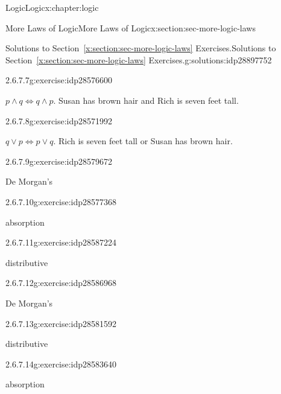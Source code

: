 \documentclass[twoside,10pt,]{book}
\newcommand{\xreffont}{\relax}
\numberwithin{equation}{section}
\begin{document}
\begin{chapterptx}{Logic}{}{Logic}{}{}{x:chapter:logic}
\begin{sectionptx}{More Laws of Logic}{}{More Laws of Logic}{}{}{x:section:sec-more-logic-laws}
\begin{solutions-subsection}{Solutions to Section~{\xreffont\ref*{x:section:sec-more-logic-laws}} Exercises.}{}{Solutions to Section~{\xreffont\ref*{x:section:sec-more-logic-laws}} Exercises.}{}{}{g:solutions:idp28897752}
\begin{exercisegroup}
\begin{divisionsolutioneg}{2.6.7.7}{}{g:exercise:idp28576600}%
\par\smallskip%
\noindent\hypertarget{g:solution:idp28574168-main}{}\(p {\wedge}{} q  {\Leftrightarrow}{}  q {\wedge}{} p\).  Susan has brown hair and Rich is seven feet tall.\end{divisionsolutioneg}%
\begin{divisionsolutioneg}{2.6.7.8}{}{g:exercise:idp28571992}%
\par\smallskip%
\noindent\hypertarget{g:solution:idp28573528-main}{}\(q {\vee}{} p  {\Leftrightarrow}{}  p {\vee}{} q\).  Rich is seven feet tall or Susan has brown hair.\end{divisionsolutioneg}%
\end{exercisegroup}
\par\medskip\noindent
\begin{exercisegroup}
\begin{divisionsolutioneg}{2.6.7.9}{}{g:exercise:idp28579672}%
\par\smallskip%
\noindent\hypertarget{g:solution:idp28576728-main}{}De Morgan's\end{divisionsolutioneg}%
\begin{divisionsolutioneg}{2.6.7.10}{}{g:exercise:idp28577368}%
\par\smallskip%
\noindent\hypertarget{g:solution:idp28583384-main}{}absorption\end{divisionsolutioneg}%
\begin{divisionsolutioneg}{2.6.7.11}{}{g:exercise:idp28587224}%
\par\smallskip%
\noindent\hypertarget{g:solution:idp28585816-main}{}distributive\end{divisionsolutioneg}%
\begin{divisionsolutioneg}{2.6.7.12}{}{g:exercise:idp28586968}%
\par\smallskip%
\noindent\hypertarget{g:solution:idp28585560-main}{}De Morgan's\end{divisionsolutioneg}%
\begin{divisionsolutioneg}{2.6.7.13}{}{g:exercise:idp28581592}%
\par\smallskip%
\noindent\hypertarget{g:solution:idp28585944-main}{}distributive\end{divisionsolutioneg}%
\begin{divisionsolutioneg}{2.6.7.14}{}{g:exercise:idp28583640}%
\par\smallskip%
\noindent\hypertarget{g:solution:idp28584664-main}{}absorption\end{divisionsolutioneg}%

\end{exercisegroup}
\end{solutions-subsection}
\end{sectionptx}
\end{chapterptx}
\end{document}
